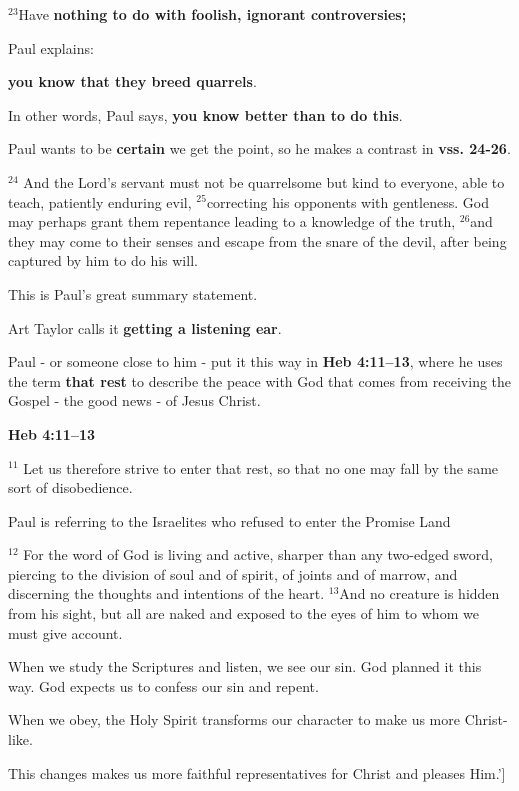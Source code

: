 \documentclass[12pt]{article} %
\newcommand{\superscript}[1]{\ensuremath{^{\textrm{#1}}}}
\begin{document}
\begin{itemize}
\superscript{23}Have \textbf{nothing to do with foolish, ignorant controversies;}

Paul explains:
  
\textbf{you know that they breed quarrels}.
  
In other words, Paul says, \textbf{you know better than to do this}.
  
Paul wants to be \textbf{certain} we get the point, so he makes a contrast
in \textbf{vss. 24-26}. 
  
\superscript{24} And the Lord’s servant must not be quarrelsome but kind to
everyone, able to teach, patiently enduring evil, \superscript{25}correcting
his opponents with gentleness. God may perhaps grant them repentance leading
to a knowledge of the truth, \superscript{26}and they may come to their senses
and escape from the snare
of the devil, after being captured by him to do his will.
  
This is Paul's great summary statement.

Art Taylor calls it \textbf{getting a listening ear}.

Paul - or someone close to him - put it this way in \textbf{Heb 4:11–13},
where he uses the term \textbf{that rest} to describe the peace with God
that comes from receiving the Gospel - the good news - of Jesus Christ.



\textbf{Heb 4:11–13}

\superscript{11} Let us therefore strive to enter that rest, so that no
one may fall by the same sort of disobedience.

Paul is referring to the Israelites who refused to enter the Promise Land

\superscript{12} For the word of God is living and active, sharper than
any two-edged sword, piercing to the division of soul and of spirit, of
joints and of marrow, and discerning the thoughts and intentions of the
heart.
\superscript{13}And no creature is hidden from his sight, but all are naked
and exposed to the eyes of him to whom we must give account. 

When we study the Scriptures and listen, we see our sin. God planned it this way.
God expects us to confess our sin and repent.

When we obey, the Holy Spirit transforms our character to make us more
Christ-like.

This changes makes us more faithful representatives for Christ and pleases Him.']


\end{itemize}
\end{document}
